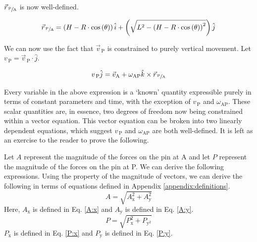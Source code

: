 \documentclass[nofoot,pdf-a,balance,colorlinks,upint,subscriptcorrection,varvw,mathalfa=cal=boondoxo]{asmeconf}
\begin{document}
    $\vec{r}_{\,\sfrac{\textrm{P}}{\textrm{A}}}$ is now well-defined.

    \begin{equation} 
        \vec{r}_{\,\sfrac{\textrm{P}}{\textrm{A}}} = \left(H - R\cdot\cos{\left(\theta\right)}\right)\hat{i} + \left(\sqrt{L^2 - \left(H - R\cdot\cos{\left(\theta\right)}\right)^2}\right)\hat{j}
    \end{equation}
    
    We can now use the fact that $\vec{v}_{\,\textrm{P}}$ is constrained to purely vertical movement. Let $v_{\,\textrm{P}} = \vec{v}_{\,\textrm{P}} \cdot \hat{j}$. 

    \begin{equation} 
        v_{\,\textrm{P}}\hat{j} = \vec{v}_{\textrm{A}} + \omega_{\textrm{AP}}\hat{k}\times \vec{r}_{\,\sfrac{\textrm{P}}{\textrm{A}}}
    \end{equation}

    Every variable in the above expression is a `known' quantity expressible purely in terms of constant parameters and time, with the exception of $v_{\,\textrm{P}}$ and $\omega_{\textrm{AP}}$. These scalar quantities are, in essence, two degrees of freedom now being constrained within a vector equation. This vector equation can be broken into two linearly dependent equations, which suggest $v_{\,\textrm{P}}$ and $\omega_{\textrm{AP}}$ are both well-defined. It is left as an exercise to the reader to prove the following.%

    



    Let $A$ represent the magnitude of the forces on the pin at A and let $P$ represent the magnitude of the forces on the pin at P. We can derive the following expressions. Using the property of the magnitude of vectors, we can derive the following in terms of equations defined in Appendix \ref{appendix:definitions}.
    \begin{equation}
        A = \sqrt{A_{\textrm{x}}^2 + A_{\textrm{y}}^2}
    \end{equation}
    Here, $A_{\textrm{x}}$ is defined in Eq. \eqref{A:x} and $A_{\textrm{y}}$ is defined in Eq. \eqref{A:y}.
    \begin{equation}
        P = \sqrt{P_{\textrm{x}}^2 + P_{\textrm{y}^2}}
    \end{equation}
    $P_{\textrm{x}}$ is defined in Eq. \eqref{P:x} and $P_{\textrm{y}}$ is defined in Eq. \eqref{P:y}.
\end{document}
